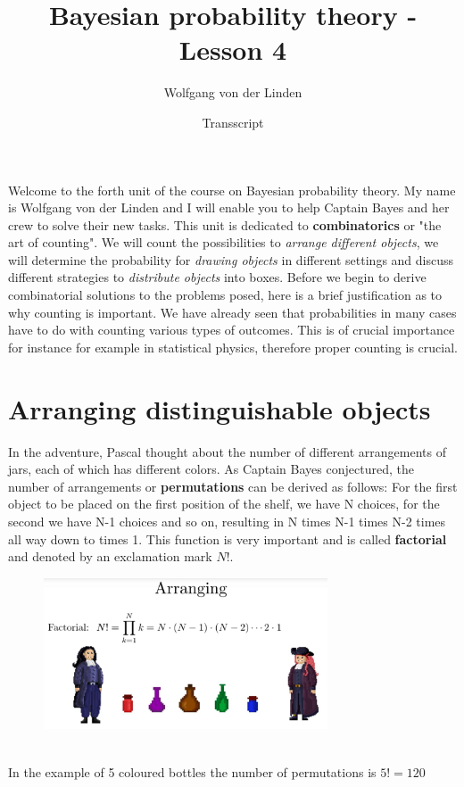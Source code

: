 \documentclass[12pt, a4paper]{scrartcl}
\title{Bayesian probability theory - Lesson 4}
\author{Wolfgang von der Linden}
\date{Transscript}
\begin{document}
\setlength{\parindent}{0pt}
\maketitle
\onehalfspacing

Welcome to the forth unit of the course on Bayesian probability theory. 
My name is Wolfgang von der Linden and I will enable you to help Captain Bayes and her crew to solve their new tasks.
This unit is dedicated to \textbf{combinatorics} or "the art of counting".
We will count the possibilities to \textit{arrange different objects}, we will determine the probability for \textit{drawing objects} in different settings and discuss different strategies to \textit{distribute objects} into boxes.
Before we begin to derive combinatorial solutions to the problems posed, here is a brief justification as to why counting is important.
We have already seen that probabilities in many cases have to do with counting various types of outcomes. This is of crucial importance for instance for example in statistical physics, therefore proper counting is crucial.\\

\section*{Arranging distinguishable objects}
In the adventure, Pascal thought about the number of different arrangements of jars, each of which has different colors. 
As Captain Bayes conjectured, the number of arrangements or \textbf{permutations} can be derived as follows:
For the first object to be placed on the first position of the shelf, we have N choices,  for the second we have N-1 choices and so on, resulting in N times N-1 times  N-2 times all way down to times 1.
This function is very important and is called \textbf{factorial} and denoted by an exclamation mark $N!$.
 \begin{figure}[H]
	\centering
	\includegraphics[width=0.75\textwidth]{4_1.png}
\end{figure}
\\
In the example of 5 coloured bottles the number of permutations is $5!=120$\\
\\
\end{document}
